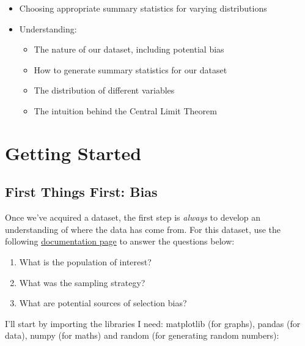 \documentclass[
  letterpaper,
  DIV=11,
  numbers=noendperiod]{scrreprt}
\providecommand{\tightlist}{%
  \setlength{\itemsep}{0pt}\setlength{\parskip}{0pt}}\usepackage{longtable,booktabs,array}
\begin{document}
\begin{itemize}
\item
  Choosing appropriate summary statistics for varying distributions
\item
  Understanding:

  \begin{itemize}
  \tightlist
  \item
    The nature of our dataset, including potential bias
  \item
    How to generate summary statistics for our dataset
  \item
    The distribution of different variables
  \item
    The intuition behind the Central Limit Theorem
  \end{itemize}
\end{itemize}

\hypertarget{getting-started-1}{%
\section{Getting Started}\label{getting-started-1}}

\hypertarget{first-things-first-bias}{%
\subsection{First Things First: Bias}\label{first-things-first-bias}}

Once we've acquired a dataset, the first step is \emph{always} to
develop an understanding of where the data has come from. For this
dataset, use the following
\href{https://www.census.gov/programs-surveys/cps/technical-documentation/methodology.html}{documentation
page} to answer the questions below:

\begin{enumerate}
\def\labelenumi{\arabic{enumi})}
\tightlist
\item
  What is the population of interest?
\item
  What was the sampling strategy?
\item
  What are potential sources of selection bias?
\end{enumerate}

I'll start by importing the libraries I need: matplotlib (for graphs),
pandas (for data), numpy (for maths) and random (for generating random
numbers):
\end{document}
